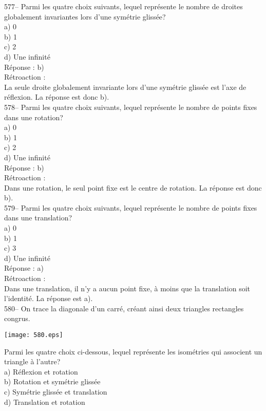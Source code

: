 ﻿\documentclass[letterpaper, 12pt]{article}
\begin{document}
577-- Parmi les quatre choix suivants, lequel repr\'esente le nombre de
droites globalement invariantes lors d'une sym\'etrie gliss\'ee?\\
a) 0\\
b) 1\\
c) 2\\
d) Une infinit\'e\\

R\'eponse : b)\\

R\'etroaction : \\
La seule droite globalement invariante lors d'une sym\'etrie gliss\'ee est
l'axe de r\'eflexion.  La r\'eponse est donc b).\\

578-- Parmi les quatre choix suivants, lequel repr\'esente le nombre de
points fixes dans une rotation?\\
a) 0\\
b) 1\\
c) 2\\
d) Une infinit\'e\\

R\'eponse : b)\\

R\'etroaction : \\
Dans une rotation, le seul point fixe est le centre de rotation.  La
r\'eponse est donc b).\\

579-- Parmi les quatre choix suivants, lequel repr\'esente le nombre de
points fixes dans une translation?\\
a) 0 \\
b) 1\\
c) 3\\
d) Une infinit\'e\\

R\'eponse : a)\\

R\'etroaction : \\
Dans une translation, il n'y a aucun point fixe, \`a moins que la
translation soit l'identit\'e.  La r\'eponse est a).\\

580-- On trace la diagonale d'un carr\'e, cr\'eant ainsi deux
triangles rectangles congrus.\\
\begin{center}
    \texttt{[image: 580.eps]}
    \end{center}
Parmi les quatre choix ci-dessous, lequel repr\'esente
les isom\'etries qui associent un triangle \`a l'autre?\\
a) R\'eflexion et rotation\\
b) Rotation et sym\'etrie gliss\'ee\\
c) Sym\'etrie gliss\'ee et translation\\
d) Translation et rotation\\
\end{document}
